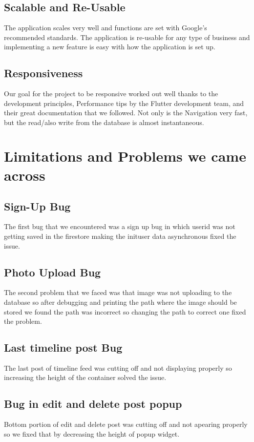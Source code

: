 \subsection{Scalable and Re-Usable}
The application scales very well and functions are set with Google's recommended
standards. The application is re-usable for any type of business and implementing a new feature is easy with how the application is set up.
\subsection{Responsiveness}
Our goal for the project to be responsive worked out well thanks to the development principles, Performance tips by the Flutter development team, and their great documentation that we followed. Not only is the Navigation very fast, but the read/also write from the database is almost instantaneous.

\section{Limitations and Problems we came across}
\subsection{Sign-Up Bug}
The first bug that we encountered was a sign up bug in which userid was not getting saved in the firestore making the inituser data asynchronous fixed the issue.
\subsection{Photo Upload Bug}
The second problem that we faced was that image was not uploading to the database so after debugging and printing the path where the image should be stored we found the path was incorrect so changing the path to correct one fixed the problem.
\subsection{Last timeline post Bug}
The last post of timeline feed was cutting off and not displaying properly so increasing the height of the container solved the issue.
\subsection{Bug in edit and delete post popup}
Bottom portion of edit and delete post was cutting off and not apearing properly
so we fixed that by decreasing the height of popup widget.
